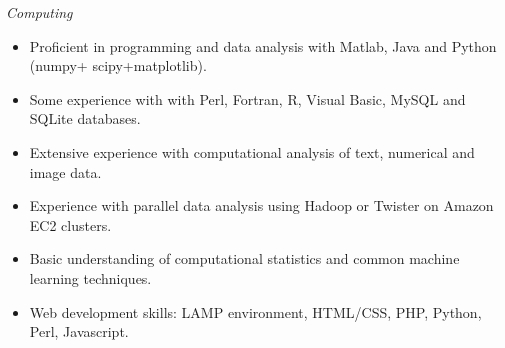 \documentclass[10pt]{article}
\begin{document}
\textit{Computing}
\begin{itemize}\setlength{\itemsep}{0cm}
  \setlength{\parskip}{0cm}

		\item Proficient in programming and data analysis with Matlab, Java and Python (numpy+ scipy+matplotlib).
		\item Some experience with with Perl, Fortran, R, Visual Basic, MySQL and SQLite databases.
		\item Extensive experience with computational analysis of text, numerical and image data.
		\item Experience with parallel data analysis using Hadoop or Twister on Amazon EC2 clusters.


		\item Basic understanding of computational statistics and common machine learning techniques.
		\item Web development skills: LAMP environment, HTML/CSS, PHP, Python, Perl, Javascript.





		

\end{itemize}
\end{document}
